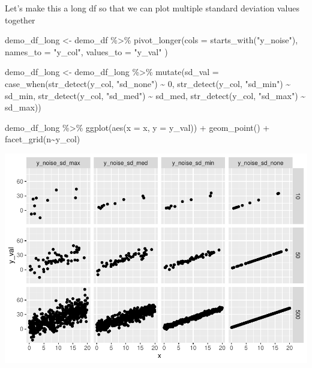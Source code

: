 \documentclass[
]{book}
\newenvironment{Shaded}{\begin{snugshade}}{\end{snugshade}}
\newcommand{\AttributeTok}[1]{\textcolor[rgb]{0.77,0.63,0.00}{#1}}
\newcommand{\DecValTok}[1]{\textcolor[rgb]{0.00,0.00,0.81}{#1}}
\newcommand{\FunctionTok}[1]{\textcolor[rgb]{0.00,0.00,0.00}{#1}}
\newcommand{\NormalTok}[1]{#1}
\newcommand{\OtherTok}[1]{\textcolor[rgb]{0.56,0.35,0.01}{#1}}
\newcommand{\SpecialCharTok}[1]{\textcolor[rgb]{0.00,0.00,0.00}{#1}}
\newcommand{\StringTok}[1]{\textcolor[rgb]{0.31,0.60,0.02}{#1}}
\begin{document}
Let's make this a long df so that we can plot multiple standard deviation values together

\begin{Shaded}
\begin{Highlighting}[]
\NormalTok{demo\_df\_long }\OtherTok{\textless{}{-}}\NormalTok{ demo\_df }\SpecialCharTok{\%\textgreater{}\%} 
  \FunctionTok{pivot\_longer}\NormalTok{(}\AttributeTok{cols =} \FunctionTok{starts\_with}\NormalTok{(}\StringTok{"y\_noise"}\NormalTok{),}
               \AttributeTok{names\_to =} \StringTok{"y\_col"}\NormalTok{,}
               \AttributeTok{values\_to =} \StringTok{"y\_val"}
\NormalTok{  )}

\NormalTok{demo\_df\_long }\OtherTok{\textless{}{-}}\NormalTok{ demo\_df\_long }\SpecialCharTok{\%\textgreater{}\%} 
  \FunctionTok{mutate}\NormalTok{(}\AttributeTok{sd\_val =} \FunctionTok{case\_when}\NormalTok{(}\FunctionTok{str\_detect}\NormalTok{(y\_col, }\StringTok{"sd\_none"}\NormalTok{) }\SpecialCharTok{\textasciitilde{}} \DecValTok{0}\NormalTok{,}
                            \FunctionTok{str\_detect}\NormalTok{(y\_col, }\StringTok{"sd\_min"}\NormalTok{) }\SpecialCharTok{\textasciitilde{}}\NormalTok{ sd\_min,}
                            \FunctionTok{str\_detect}\NormalTok{(y\_col, }\StringTok{"sd\_med"}\NormalTok{) }\SpecialCharTok{\textasciitilde{}}\NormalTok{ sd\_med,}
                            \FunctionTok{str\_detect}\NormalTok{(y\_col, }\StringTok{"sd\_max"}\NormalTok{) }\SpecialCharTok{\textasciitilde{}}\NormalTok{ sd\_max))}
\end{Highlighting}
\end{Shaded}

\begin{Shaded}
\begin{Highlighting}[]
\NormalTok{demo\_df\_long }\SpecialCharTok{\%\textgreater{}\%} 
  \FunctionTok{ggplot}\NormalTok{(}\FunctionTok{aes}\NormalTok{(}\AttributeTok{x =}\NormalTok{ x, }\AttributeTok{y =}\NormalTok{ y\_val)) }\SpecialCharTok{+}
  \FunctionTok{geom\_point}\NormalTok{() }\SpecialCharTok{+}
  \FunctionTok{facet\_grid}\NormalTok{(n}\SpecialCharTok{\textasciitilde{}}\NormalTok{y\_col)}
\end{Highlighting}
\end{Shaded}

\includegraphics{test_course_notes_files/figure-latex/unnamed-chunk-84-1.pdf}
\end{document}
